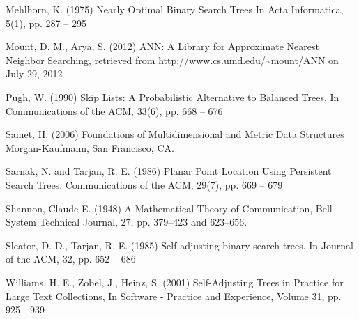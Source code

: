 \documentclass[mcs]{scsthesis}
\begin{document}
\begin{thebibliography}{5}
Mehlhorn, K. (1975) Nearly Optimal Binary Search Trees 
In Acta Informatica, 5(1), pp. 287 – 295

Mount, D. M., Arya, S. (2012) ANN: A Library for Approximate Nearest Neighbor
Searching, retrieved from \url{http://www.cs.umd.edu/~mount/ANN} on July 29, 2012 

Pugh, W. (1990) Skip Lists: A Probabilistic Alternative to Balanced Trees.
In Communications of the ACM, 33(6), pp. 668 – 676

Samet, H. (2006) Foundations of Multidimensional and Metric Data Structures
Morgan-Kaufmann, San Francisco, CA.

Sarnak, N. and Tarjan, R. E. (1986) Planar Point Location Using Persistent
Search Trees. Communications of the ACM, 29(7), pp. 669 -- 679

Shannon, Claude E. (1948) A Mathematical Theory of Communication,
Bell System Technical Journal, 27, pp. 379--423 and 623--656.

Sleator, D. D., Tarjan, R. E. (1985) Self-adjusting binary search trees.
In Journal of the ACM, 32, pp. 652 – 686

Williams, H. E., Zobel, J., Heinz, S. (2001) Self-Adjusting Trees in Practice
for Large Text Collections, In Software - Practice and Experience,
Volume 31, pp. 925 - 939

\end{thebibliography}
\end{document}
